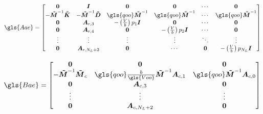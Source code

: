 \begin{equation}\label{eq:matriz-dinamica-aeroelastico}
    \gls{Aae} = \begin{bmatrix}
    \boldsymbol{0}                                               & \boldsymbol{I}                                               & \boldsymbol{0}                                 & \boldsymbol{0} & \cdots & \boldsymbol{0} \\
    -\boldsymbol{\Tilde{M}}^{-1}\boldsymbol{\Tilde{K}} & -\boldsymbol{\Tilde{M}}^{-1}\boldsymbol{\Tilde{D}} &  \gls{qoo}\boldsymbol{\Tilde{M}}^{-1}    &  \gls{qoo}\boldsymbol{\Tilde{M}}^{-1}  & \cdots & \gls{qoo}\boldsymbol{\Tilde{M}}^{-1} \\
    \boldsymbol{0}                                               & \boldsymbol{A}_{r,3}                                         & -\left( \frac{V}{b} \right)p_{1}\boldsymbol{I} & \boldsymbol{0} & \cdots & \boldsymbol{0} \\
    \boldsymbol{0}                                               & \boldsymbol{A}_{r,4}                                 & \boldsymbol{0}                                 & -\left( \frac{V}{b} \right)p_{2}\boldsymbol{I} & \cdots & \boldsymbol{0} \\
    \vdots & \vdots & \vdots & \vdots & \ddots & \vdots \\
    \boldsymbol{0}                                               & \boldsymbol{A}_{r,N_{L}+2}                                 & \boldsymbol{0}                                 & \cdots & \boldsymbol{0}  & -\left( \frac{V}{b} \right)p_{N_{L}}\boldsymbol{I}  \\
    \end{bmatrix}
\end{equation}

\begin{equation}\label{eq:matriz-controle-aeroelastico}
    \gls{Bae} = \begin{bmatrix}
        \boldsymbol{0} & \boldsymbol{0} & \boldsymbol{0} \\
        -\boldsymbol{\Tilde{M}}^{-1}\boldsymbol{\Tilde{M}}_{c} & \gls{qoo}\frac{b}{\gls{Voo}}\boldsymbol{\Tilde{M}}^{-1}\boldsymbol{A}_{c,1} & \gls{qoo}\boldsymbol{\Tilde{M}}^{-1}\boldsymbol{A}_{c,0} \\
        \boldsymbol{0} & \boldsymbol{A}_{c,3} & \boldsymbol{0} \\
        \vdots & \vdots & \vdots \\
        \boldsymbol{0} & \boldsymbol{A}_{c,N_{L}+2} & \boldsymbol{0}
    \end{bmatrix}
\end{equation}

